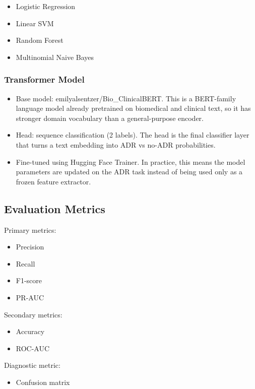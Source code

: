 \documentclass[11pt]{article}
\begin{document}
\begin{itemize}
  \item Logistic Regression
  \item Linear SVM
  \item Random Forest
  \item Multinomial Naive Bayes
\end{itemize}

\subsubsection{Transformer Model}

\begin{itemize}
  \item Base model: emilyalsentzer/Bio\_ClinicalBERT. This is a BERT-family language model already pretrained on biomedical and clinical text, so it has stronger domain vocabulary than a general-purpose encoder.
  \item Head: sequence classification (2 labels). The head is the final classifier layer that turns a text embedding into ADR vs no-ADR probabilities.
  \item Fine-tuned using Hugging Face Trainer. In practice, this means the model parameters are updated on the ADR task instead of being used only as a frozen feature extractor.
\end{itemize}

\subsection{Evaluation Metrics}

Primary metrics:


\begin{itemize}
  \item Precision
  \item Recall
  \item F1-score
  \item PR-AUC
\end{itemize}

Secondary metrics:


\begin{itemize}
  \item Accuracy
  \item ROC-AUC
\end{itemize}

Diagnostic metric:


\begin{itemize}
  \item Confusion matrix
\end{itemize}
\end{document}
